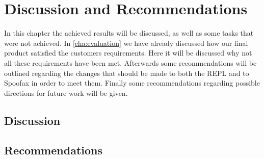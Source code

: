 \chapter{Discussion and Recommendations}
\label{cha:disc-recomm}

In this chapter the achieved results will be discussed, as well as some tasks
that were not achieved. In \cref{cha:evaluation} we have already discussed how
our final product satisfied the customers requirements. Here it will be
discussed why not all these requirements have been met. Afterwards some
recommendations will be outlined regarding the changes that should be made to
both the REPL and to Spoofax in order to meet them. Finally some
recommendations regarding possible directions for future work will be given.

\section{Discussion}
\label{sec:discuss-discussion}



\section{Recommendations}
\label{sec:discuss-future}





